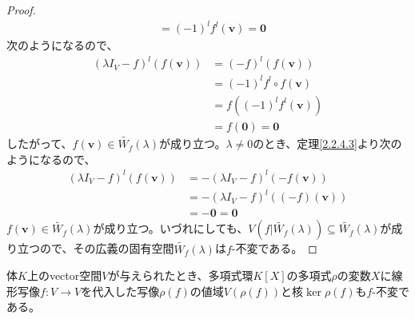 \documentclass[dvipdfmx]{jsarticle}
\begin{document}
\begin{proof}
\begin{align*}
&= ( - 1)^{l}f^{l}\left( \mathbf{v} \right) = \mathbf{0}
\end{align*}
次のようになるので、
\begin{align*}
\left( \lambda I_{V} - f \right)^{l}\left( f\left( \mathbf{v} \right) \right) &= ( - f)^{l}\left( f\left( \mathbf{v} \right) \right)\\
&= ( - 1)^{l}f^{l} \circ f\left( \mathbf{v} \right)\\
&= f\left( ( - 1)^{l}f^{l}\left( \mathbf{v} \right) \right)\\
&= f\left( \mathbf{0} \right) = \mathbf{0}
\end{align*}
したがって、$f\left( \mathbf{v} \right) \in \widetilde{W_{f}}(\lambda)$が成り立つ。$\lambda \neq 0$のとき、定理\ref{2.2.4.3}より次のようになるので、
\begin{align*}
\left( \lambda I_{V} - f \right)^{l}\left( f\left( \mathbf{v} \right) \right) &= - \left( \lambda I_{V} - f \right)^{l}\left( - f\left( \mathbf{v} \right) \right)\\
&= - \left( \lambda I_{V} - f \right)^{l}\left( ( - f)\left( \mathbf{v} \right) \right)\\
&= - \mathbf{0} = \mathbf{0}
\end{align*}
$f\left( \mathbf{v} \right) \in \widetilde{W_{f}}(\lambda)$が成り立つ。いづれにしても、$V\left( f|\widetilde{W_{f}}(\lambda) \right) \subseteq \widetilde{W_{f}}(\lambda)$が成り立つので、その広義の固有空間$\widetilde{W_{f}}(\lambda)$は$f$-不変である。
\end{proof}
\begin{thm}
\label{2.2.4.11}
体$K$上のvector空間$V$が与えられたとき、多項式環$K[ X]$の多項式$\rho$の変数$X$に線形写像$f:V \rightarrow V$を代入した写像$\rho(f)$の値域$V\left( \rho(f) \right)$と核$\ker{\rho(f)}$も$f$-不変である。
\end{thm}
\end{document}
